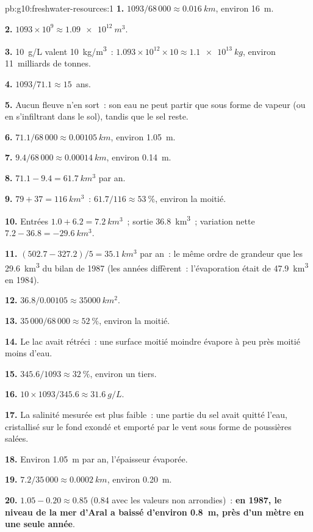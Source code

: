 \begin{solution}{pb:g10:freshwater-resources:1}
\textbf{1.} $1093/68\,000 \approx \qty{0.016}{km}$, environ \qty{16}{m}.

\textbf{2.} $1093 \times 10^9 \approx \qty{1.09e12}{m^3}$.

\textbf{3.} \qty{10}{g/L} valent \qty{10}{kg/m^3}~: $1.093 \times 10^{12} \times 10
\approx \qty{1.1e13}{kg}$, environ \num{11}~milliards de tonnes.

\textbf{4.} $1093/71.1 \approx 15$~ans.

\textbf{5.} Aucun fleuve n'en sort~: son eau ne peut partir que sous forme
de vapeur (ou en s'infiltrant dans le sol), tandis que le sel reste.

\textbf{6.} $71.1/68\,000 \approx \qty{0.00105}{km}$, environ \qty{1.05}{m}.

\textbf{7.} $9.4/68\,000 \approx \qty{0.00014}{km}$, environ \qty{0.14}{m}.

\textbf{8.} $71.1 - 9.4 = \qty{61.7}{km^3}$ par an.

\textbf{9.} $79 + 37 = \qty{116}{km^3}$~: $61.7/116 \approx \qty{53}{\percent}$,
environ la moitié.

\textbf{10.} Entrées $1.0 + 6.2 = \qty{7.2}{km^3}$~; sortie \qty{36.8}{km^3}~;
variation nette $7.2 - 36.8 = \qty{-29.6}{km^3}$.

\textbf{11.} $(502.7 - 327.2)/5 = \qty{35.1}{km^3}$ par an~: le même ordre
de grandeur que les \qty{29.6}{km^3} du bilan de 1987 (les années
diffèrent~: l'évaporation était de \qty{47.9}{km^3} en 1984).

\textbf{12.} $36.8/0.00105 \approx \qty{35000}{km^2}$.

\textbf{13.} $35\,000/68\,000 \approx \qty{52}{\percent}$, environ la moitié.

\textbf{14.} Le lac avait rétréci~: une surface moitié moindre évapore à peu
près moitié moins d'eau.

\textbf{15.} $345.6/1093 \approx \qty{32}{\percent}$, environ un tiers.

\textbf{16.} $10 \times 1093/345.6 \approx \qty{31.6}{g/L}$.

\textbf{17.} La salinité mesurée est plus faible~: une partie du sel avait
quitté l'eau, cristallisé sur le fond exondé et emporté par le vent sous
forme de poussières salées.

\textbf{18.} Environ \qty{1.05}{m} par an, l'épaisseur évaporée.

\textbf{19.} $7.2/35\,000 \approx \qty{0.0002}{km}$, environ \qty{0.20}{m}.

\textbf{20.} $1.05 - 0.20 \approx 0.85$ (\num{0.84} avec les valeurs non
arrondies)~: \textbf{en 1987, le niveau de la mer d'Aral a baissé
d'environ \qty{0.8}{m}, près d'un mètre en une seule année}.
\end{solution}
